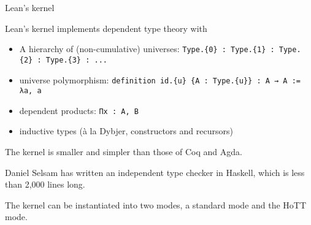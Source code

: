 \documentclass[xcolor=table]{beamer}
\begin{document}
\begin{frame}[fragile]{Lean's kernel}

Lean's kernel implements dependent type theory with
\begin{itemize}
 \item A hierarchy of (non-cumulative) universes:
       \lstinline~Type.{0} : Type.{1} : Type.{2} : Type.{3} : ...~
 \item universe polymorphism:
       \lstinline~definition id.{u} {A : Type.{u}} : A → A := λa, a~
 \item dependent products: \lstinline{Πx : A, B}
 \item inductive types (\`a la Dybjer, constructors and recursors)
\end{itemize}

\bigskip

The kernel is smaller and simpler than those of Coq and Agda.

\bigskip

Daniel Selsam has written an independent type checker in Haskell, which is less than 2,000 lines
long.

\bigskip

The kernel can be instantiated into two modes, a standard mode and the HoTT mode.

\end{frame}

\end{document}
